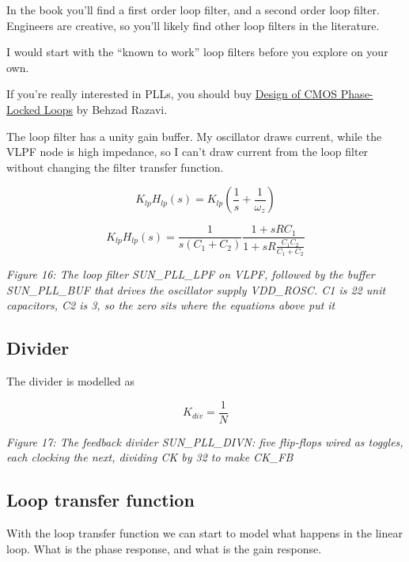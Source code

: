 In the book you'll find a first order loop filter, and a second order
loop filter. Engineers are creative, so you'll likely find other loop
filters in the literature.

I would start with the ``known to work'' loop filters before you explore
on your own.

If you're really interested in PLLs, you should buy
\href{https://www.amazon.com/Design-CMOS-Phase-Locked-Loops-Architecture/dp/1108494544}{Design
of CMOS Phase-Locked Loops} by Behzad Razavi.

The loop filter has a unity gain buffer. My oscillator draws current,
while the VLPF node is high impedance, so I can't draw current from the
loop filter without changing the filter transfer function.

\[ K_{lp}H_{lp}(s)= K_{lp}\left(\frac{1}{s} + \frac{1}{\omega_z}\right) \]

\[ K_{lp}H_{lp}(s) = \frac{1}{s(C_1 + C_2)}\frac{1 + s R C_1}{1 +
sR\frac{C_1C_2}{C_1 + C_2}}\]


{
\centering
{}
}

\emph{Figure 16: The loop filter SUN\_PLL\_LPF on VLPF, followed by the
buffer SUN\_PLL\_BUF that drives the oscillator supply VDD\_ROSC. C1 is
22 unit capacitors, C2 is 3, so the zero sits where the equations above
put it}

\subsection{Divider}\label{divider}

The divider is modelled as

\[ K_{div} = \frac{1}{N}\]


{
\centering
{}
}

\emph{Figure 17: The feedback divider SUN\_PLL\_DIVN: five flip-flops
wired as toggles, each clocking the next, dividing CK by 32 to make
CK\_FB}

\subsection{Loop transfer function}\label{loop-transfer-function}

With the loop transfer function we can start to model what happens in
the linear loop. What is the phase response, and what is the gain
response.

